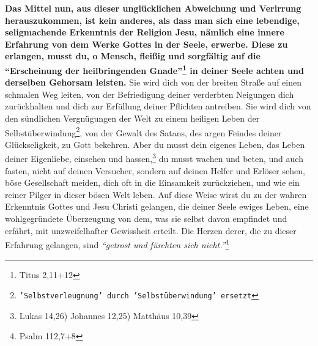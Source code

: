 \textbf{Das Mittel nun, aus dieser unglücklichen Abweichung und Verirrung
herauszukommen,
ist kein anderes, als dass man sich eine lebendige, seligmachende Erkenntnis der
Religion Jesu, nämlich eine innere Erfahrung von dem
Werke Gottes in der Seele,
erwerbe. Diese zu erlangen, musst du, o Mensch, fleißig und sorgfältig auf die
"`Erscheinung der heilbringenden Gnade"'\footnote{Titus 2,11+12}
in deiner Seele
achten und derselben Gehorsam leisten.} Sie wird dich von der breiten Straße auf
einen schmalen Weg leiten, von der Befriedigung deiner verderbten Neigungen dich
zurückhalten und dich zur Erfüllung deiner Pflichten antreiben.
Sie wird dich
von den sündlichen Vergnügungen der Welt zu einem
heiligen Leben der
Selbstüberwindung\footnote{\texttt{'Selbstverleugnung' durch 'Selbstüberwindung'
ersetzt}}, von der Gewalt des Satans, des argen Feindes
deiner
Glückseligkeit, zu Gott bekehren. Aber du musst dein
eigenes Leben, das Leben
deiner Eigenliebe, einsehen und hassen,\footnote{Lukas
14,26) Johannes 12,25) Matthäus 10,39}
du musst wachen und beten, und auch fasten, nicht auf
deinen Versucher,
sondern auf deinen Helfer und Erlöser sehen, böse
Gesellschaft meiden, dich oft
in die Einsamkeit zurückziehen, und wie ein reiner
Pilger in dieser bösen Welt
leben. Auf diese Weise wirst du zu der wahren Erkenntnis
Gottes und Jesu Christi
gelangen, die deiner Seele ewiges Leben, eine wohlgegründete
Überzeugung von
dem, was sie selbst davon empfindet und erfährt, mit unzweifelhafter Gewissheit
erteilt. Die Herzen derer, die zu dieser Erfahrung gelangen, sind
\textit{"`getrost und fürchten sich nicht."'}\footnote{Psalm 112,7+8}


